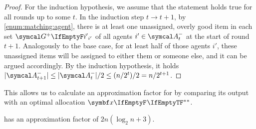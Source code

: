 \begin{proof}
	For the induction hypothesis, we assume that the statement holds true for all rounds up to some \(t\).
	In the induction step \(t \to t+1\), by \cref{enum:matching:agent}, there is at least one unassigned, overly good item in each set \(\overlygoodset[i']\) of all agents \(i' \in \unluckyagents{t}\) at the start of round \(t+1\).
	Analogously to the base case, for at least half of those agents \(i'\), these unassigned items will be assigned to either them or someone else, and it can be argued accordingly.
	By the induction hypothesis, it holds \(\abs{\unluckyagents{t+1}} \le \abs{\unluckyagents{t}}/2 \le (n/2^t)/2 = n/2^{t+1}\).
\end{proof}

This allows us to calculate an approximation factor for \RepReMatch{} by comparing its output with an optimal allocation \(\alloc*[][]\).
\begin{theorem}
	\label{th:reprematch}
	\RepReMatch{} has an approximation factor of \(2n (\log_2 n + 3)\).
\end{theorem}
